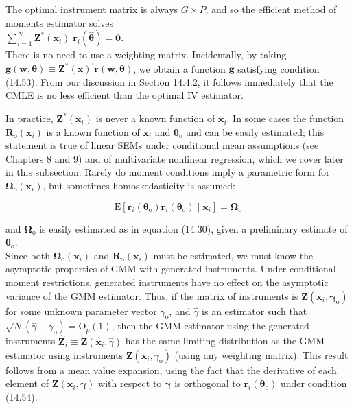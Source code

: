 \documentclass[10pt]{article}
\begin{document}
The optimal instrument matrix is always $G \times P$, and so the efficient method of moments estimator solves\\
$\sum_{i=1}^{N} \mathbf{Z}^{*}\left(\mathbf{x}_{i}\right)^{\prime} \mathbf{r}_{i}(\hat{\boldsymbol{\theta}})=\mathbf{0}$.\\
There is no need to use a weighting matrix. Incidentally, by taking $\mathbf{g}(\mathbf{w}, \boldsymbol{\theta}) \equiv \mathbf{Z}^{*}(\mathbf{x})^{\prime} \mathbf{r}(\mathbf{w}, \boldsymbol{\theta})$, we obtain a function $\mathbf{g}$ satisfying condition (14.53). From our discussion in Section 14.4.2, it follows immediately that the CMLE is no less efficient than the optimal IV estimator.

In practice, $\mathbf{Z}^{*}\left(\mathbf{x}_{i}\right)$ is never a known function of $\mathbf{x}_{i}$. In some cases the function $\mathbf{R}_{\mathrm{o}}\left(\mathbf{x}_{i}\right)$ is a known function of $\mathbf{x}_{i}$ and $\boldsymbol{\theta}_{\mathrm{o}}$ and can be easily estimated; this statement is true of linear SEMs under conditional mean assumptions (see Chapters 8 and 9) and of multivariate nonlinear regression, which we cover later in this subsection. Rarely do moment conditions imply a parametric form for $\boldsymbol{\Omega}_{\mathrm{o}}\left(\mathbf{x}_{i}\right)$, but sometimes homoskedasticity is assumed:


\begin{equation*}
\mathrm{E}\left[\mathbf{r}_{i}\left(\boldsymbol{\theta}_{\mathrm{o}}\right) \mathbf{r}_{i}\left(\boldsymbol{\theta}_{\mathrm{o}}\right) \mid \mathbf{x}_{i}\right]=\boldsymbol{\Omega}_{\mathrm{o}} \tag{14.58}
\end{equation*}


and $\boldsymbol{\Omega}_{\mathrm{o}}$ is easily estimated as in equation (14.30), given a preliminary estimate of $\boldsymbol{\theta}_{\mathrm{o}}$.\\
Since both $\boldsymbol{\Omega}_{\mathrm{o}}\left(\mathbf{x}_{i}\right)$ and $\mathbf{R}_{\mathrm{o}}\left(\mathbf{x}_{i}\right)$ must be estimated, we must know the asymptotic properties of GMM with generated instruments. Under conditional moment restrictions, generated instruments have no effect on the asymptotic variance of the GMM estimator. Thus, if the matrix of instruments is $\mathbf{Z}\left(\mathbf{x}_{i}, \boldsymbol{\gamma}_{\mathrm{o}}\right)$ for some unknown parameter vector $\gamma_{\mathrm{o}}$, and $\hat{\gamma}$ is an estimator such that $\sqrt{N}\left(\hat{\gamma}-\gamma_{\mathrm{o}}\right)=\mathrm{O}_{p}(1)$, then the GMM estimator using the generated instruments $\hat{\mathbf{Z}}_{i} \equiv \mathbf{Z}\left(\mathbf{x}_{i}, \hat{\gamma}\right)$ has the same limiting distribution as the GMM estimator using instruments $\mathbf{Z}\left(\mathbf{x}_{i}, \gamma_{\mathrm{o}}\right)$ (using any weighting matrix). This result follows from a mean value expansion, using the fact that the derivative of each element of $\mathbf{Z}\left(\mathbf{x}_{i}, \boldsymbol{\gamma}\right)$ with respect to $\boldsymbol{\gamma}$ is orthogonal to $\mathbf{r}_{i}\left(\boldsymbol{\theta}_{\mathrm{o}}\right)$ under condition (14.54):
\end{document}
